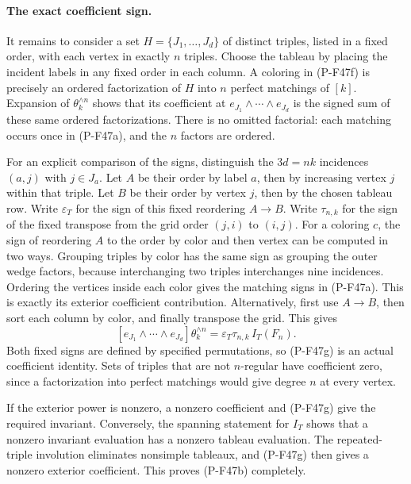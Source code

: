 \documentclass[11pt,a4paper]{article}
\begin{document}
\paragraph{The exact coefficient sign.}
It remains to consider a set $H=\{J_1,\ldots,J_d\}$
of distinct triples, listed in a fixed order, with
each vertex in exactly $n$ triples. Choose the tableau
by placing the incident labels in any fixed order in
each column. A coloring in (P-F47f) is precisely an
ordered factorization of $H$ into $n$ perfect matchings
of $[k]$. Expansion of $\theta_k^{\wedge n}$ shows that
its coefficient at $e_{J_1}\wedge\cdots\wedge e_{J_d}$
is the signed sum of these same ordered factorizations.
There is no omitted factorial: each matching occurs
once in (P-F47a), and the $n$ factors are ordered.

For an explicit comparison of the signs, distinguish
the $3d=nk$ incidences $(a,j)$ with $j\in J_a$.
Let $A$ be their order by label $a$, then by increasing
vertex $j$ within that triple. Let $B$ be their order
by vertex $j$, then by the chosen tableau row. Write
$\varepsilon_T$ for the sign of this fixed reordering
$A\to B$. Write $\tau_{n,k}$ for the sign of the fixed
transpose from the grid order $(j,i)$ to $(i,j)$.
For a coloring $c$, the sign of reordering $A$ to
the order by color and then vertex can be computed
in two ways. Grouping triples by color has the same
sign as grouping the outer wedge factors, because
interchanging two triples interchanges nine incidences.
Ordering the vertices inside each color gives the
matching signs in (P-F47a). This is exactly its exterior
coefficient contribution. Alternatively, first use
$A\to B$, then sort each column by color, and finally
transpose the grid. This gives
\[
 [e_{J_1}\wedge\cdots\wedge e_{J_d}]
                \theta_k^{\wedge n}
       =\varepsilon_T\tau_{n,k}\,I_T(F_n).
                                                        \tag{P-F47g}
\]
Both fixed signs are defined by specified permutations,
so (P-F47g) is an actual coefficient identity.
Sets of triples that are not $n$-regular have coefficient
zero, since a factorization into perfect matchings
would give degree $n$ at every vertex.

If the exterior power is nonzero, a nonzero coefficient
and (P-F47g) give the required invariant. Conversely,
the spanning statement for $I_T$ shows that a nonzero
invariant evaluation has a nonzero tableau evaluation.
The repeated-triple involution eliminates nonsimple
tableaux, and (P-F47g) then gives a nonzero exterior
coefficient. This proves (P-F47b) completely.
\end{document}
